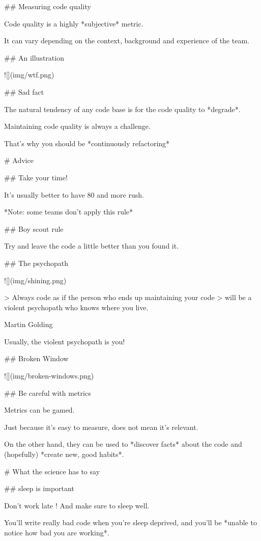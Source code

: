 ## Measuring code quality

Code quality is a highly *subjective* metric.

It can vary depending on the context, background and
experience of the team.

## An illustration

![](img/wtf.png)

## Sad fact

The natural tendency of any code base is for the code quality to *degrade*.

Maintaining code quality is always a challenge.

That's why you should be *continuously refactoring*

#  Advice

## Take your time!

It's usually better to have 80%
and more rush.


\vfill

*Note: some teams don't apply this rule*

## Boy scout rule

Try and leave the code a little better than you found it.

## The psychopath

![](img/shining.png)


> Always code as if the person who ends up maintaining your code
> will be a violent psychopath who knows where you live.

Martin Golding

Usually, the violent psychopath is you!

## Broken Window

![](img/broken-windows.png)


## Be careful with metrics

Metrics can be gamed.

Just because it's easy to measure, does not mean it's relevant.

\vfill

On the other hand, they can be used to *discover facts* about the code
and (hopefully) *create new, good habits*.

# What the science has to say

## sleep is important

Don't work late ! And make sure to sleep well.

You'll write really bad code when you're sleep deprived, and you'll be
*unable to notice how bad you are working*.

